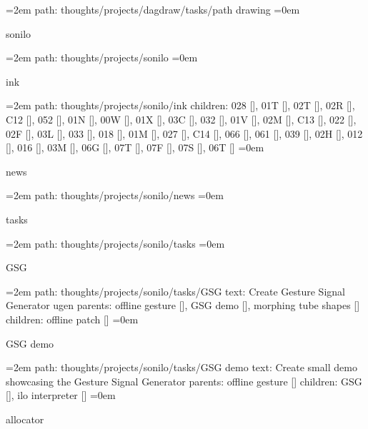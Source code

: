 \leftskip=2em
path: thoughts/projects/dagdraw/tasks/path drawing
\smallskip
\leftskip=0em
\par\endgroup
\bigskip
{}
sonilo
\smallskip
\par\begingroup
\leftskip=2em
path: thoughts/projects/sonilo
\smallskip
\leftskip=0em
\par\endgroup
\bigskip
{}
ink
\smallskip
\par\begingroup
\leftskip=2em
path: thoughts/projects/sonilo/ink
\smallskip
children: 028 [], 01T [], 02T [], 02R [], C12 [], 052 [], 01N [], 00W [], 01X [], 03C [], 032 [], 01V [], 02M [], C13 [], 022 [], 02F [], 03L [], 033 [], 018 [], 01M [], 027 [], C14 [], 066 [], 061 [], 039 [], 02H [], 012 [], 016 [], 03M [], 06G [], 07T [], 07F [], 07S [], 06T []
\smallskip
\leftskip=0em
\par\endgroup
\bigskip
{}
news
\smallskip
\par\begingroup
\leftskip=2em
path: thoughts/projects/sonilo/news
\smallskip
\leftskip=0em
\par\endgroup
\bigskip
{}
tasks
\smallskip
\par\begingroup
\leftskip=2em
path: thoughts/projects/sonilo/tasks
\smallskip
\leftskip=0em
\par\endgroup
\bigskip
{}
GSG
\smallskip
\par\begingroup
\leftskip=2em
path: thoughts/projects/sonilo/tasks/GSG
\smallskip
text:  Create Gesture Signal Generator ugen
\smallskip
parents:  offline gesture [], GSG demo [], morphing tube shapes []
\smallskip
children: offline patch []
\smallskip
\leftskip=0em
\par\endgroup
\bigskip
{}
GSG demo
\smallskip
\par\begingroup
\leftskip=2em
path: thoughts/projects/sonilo/tasks/GSG demo
\smallskip
text:  Create small demo showcasing the Gesture Signal Generator
\smallskip
parents:  offline gesture []
\smallskip
children: GSG [], ilo interpreter []
\smallskip
\leftskip=0em
\par\endgroup
\bigskip
{}
allocator
\smallskip
\par\begingroup
